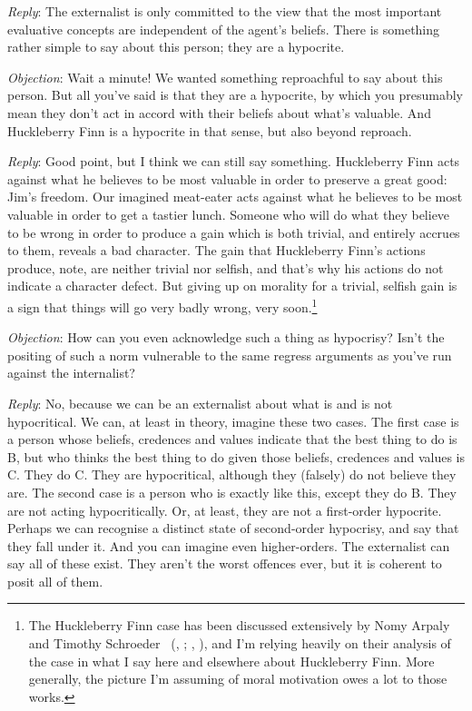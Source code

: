 \documentclass[
  10pt,
  letterpaper,
  DIV=11,
  numbers=noendperiod,
  twoside]{scrartcl}
\begin{document}
\emph{Reply}: The externalist is only committed to the view that the
most important evaluative concepts are independent of the agent's
beliefs. There is something rather simple to say about this person; they
are a hypocrite.

\emph{Objection}: Wait a minute! We wanted something reproachful to say
about this person. But all you've said is that they are a hypocrite, by
which you presumably mean they don't act in accord with their beliefs
about what's valuable. And Huckleberry Finn is a hypocrite in that
sense, but also beyond reproach.

\emph{Reply}: Good point, but I think we can still say something.
Huckleberry Finn acts against what he believes to be most valuable in
order to preserve a great good: Jim's freedom. Our imagined meat-eater
acts against what he believes to be most valuable in order to get a
tastier lunch. Someone who will do what they believe to be wrong in
order to produce a gain which is both trivial, and entirely accrues to
them, reveals a bad character. The gain that Huckleberry Finn's actions
produce, note, are neither trivial nor selfish, and that's why his
actions do not indicate a character defect. But giving up on morality
for a trivial, selfish gain is a sign that things will go very badly
wrong, very soon.\footnote{The Huckleberry Finn case has been discussed
  extensively by Nomy Arpaly and Timothy Schroeder
  ~(,
  ;
  ,
  ), and I'm relying heavily on
  their analysis of the case in what I say here and elsewhere about
  Huckleberry Finn. More generally, the picture I'm assuming of moral
  motivation owes a lot to those works.}

\emph{Objection}: How can you even acknowledge such a thing as
hypocrisy? Isn't the positing of such a norm vulnerable to the same
regress arguments as you've run against the internalist?

\emph{Reply}: No, because we can be an externalist about what is and is
not hypocritical. We can, at least in theory, imagine these two cases.
The first case is a person whose beliefs, credences and values indicate
that the best thing to do is B, but who thinks the best thing to do
given those beliefs, credences and values is C. They do C. They are
hypocritical, although they (falsely) do not believe they are. The
second case is a person who is exactly like this, except they do B. They
are not acting hypocritically. Or, at least, they are not a first-order
hypocrite. Perhaps we can recognise a distinct state of second-order
hypocrisy, and say that they fall under it. And you can imagine even
higher-orders. The externalist can say all of these exist. They aren't
the worst offences ever, but it is coherent to posit all of them.
\end{document}

